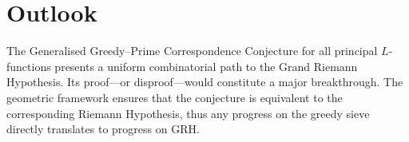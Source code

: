 \documentclass[12pt,a4paper]{article}
\begin{document}
\section{Outlook}
The Generalised Greedy--Prime Correspondence Conjecture for all principal \(L\)-functions presents a uniform combinatorial path to the Grand Riemann Hypothesis.  Its proof—or disproof—would constitute a major breakthrough.  The geometric framework ensures that the conjecture is equivalent to the corresponding Riemann Hypothesis, thus any progress on the greedy sieve directly translates to progress on GRH.
\end{document}
